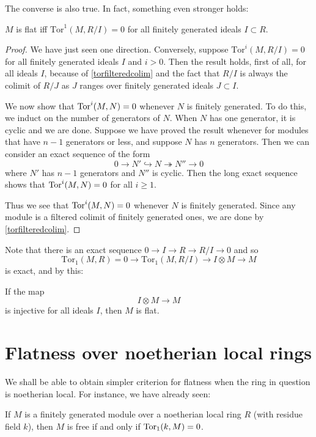 The converse is also true. In fact, something even stronger holds:
\begin{proposition} $M$ is flat iff $\mathrm{Tor} ^1(M,R/I)=0$ for all finitely generated ideals $I \subset R$.
\end{proposition}
\begin{proof}
We have just seen one direction. 
Conversely, suppose $\mathrm{Tor} ^i(M,R/I) = 0$ for all finitely generated
ideals $I$ and $i>0$. 
Then the result holds, first of all, for all ideals $I$, because of
\cref{torfilteredcolim} and the fact that $R/I$ is always the colimit of $R/J$
as $J$ ranges over finitely generated ideals $J \subset I$.

We now show that $\operatorname{Tor}^i(M, N) = 0$ whenever $N$ is finitely generated. To do
this, we induct on the number of generators of $N$. When $N$ has one
generator, it is cyclic and we are done. Suppose we have proved the result
whenever for modules that have $n-1$ generators or less, and suppose $N$ has
$n$ generators.
Then we can consider an exact sequence of the form
\[ 0 \to N' \hookrightarrow N \twoheadrightarrow N'' \to 0  \]
where $N'$ has $n-1$ generators and $N''$ is cyclic. Then the long exact
sequence shows that $\operatorname{Tor}^i(M, N) = 0$ for all $i \geq 1$.

Thus we see that $\operatorname{Tor}^i(M, N)  = 0$ whenever $N$ is finitely generated. Since
any module is a filtered colimit of finitely generated ones, we are done by
\cref{torfilteredcolim}.
\end{proof}


Note that there is an exact sequence $0 \to I \to R \to R/I \to 0$ and
so
\[ \mathrm{Tor} _1(M,R)=0 \to \mathrm{Tor} _1(M,R/I) \to I \otimes M \to M \]
is exact, and by this:

\begin{corollary} 
If the map
\[ I \otimes M \to M \]
is injective for all ideals $I$, then $M$ is flat.
\end{corollary} 


\section{Flatness over noetherian local rings}

We shall be able to obtain simpler criterion for flatness when the ring in
question is noetherian local. For instance, we have already seen:

\begin{theorem} 
If $M$ is a finitely generated module over a noetherian local ring $R$ (with
residue field $k$), then $M$ is free if and only if
$\operatorname{Tor}_1(k, M) = 0$.
\end{theorem} 

